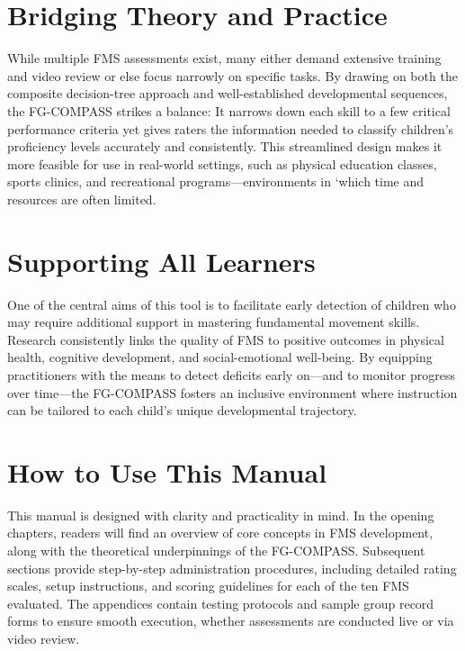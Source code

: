 \documentclass[
  letterpaper,
  DIV=11,
  numbers=noendperiod]{scrreprt}
\begin{document}
\section*{Bridging Theory and
Practice}\label{bridging-theory-and-practice}


While multiple FMS assessments exist, many either demand extensive
training and video review or else focus narrowly on specific tasks. By
drawing on both the composite decision-tree approach and
well-established developmental sequences, the FG-COMPASS strikes a
balance: It narrows down each skill to a few critical performance
criteria yet gives raters the information needed to classify children's
proficiency levels accurately and consistently. This streamlined design
makes it more feasible for use in real-world settings, such as physical
education classes, sports clinics, and recreational
programs---environments in `which time and resources are often limited.

\section*{Supporting All Learners}\label{supporting-all-learners}


One of the central aims of this tool is to facilitate early detection of
children who may require additional support in mastering fundamental
movement skills. Research consistently links the quality of FMS to
positive outcomes in physical health, cognitive development, and
social-emotional well-being. By equipping practitioners with the means
to detect deficits early on---and to monitor progress over time---the
FG-COMPASS fosters an inclusive environment where instruction can be
tailored to each child's unique developmental trajectory.

\section*{How to Use This Manual}\label{how-to-use-this-manual}


This manual is designed with clarity and practicality in mind. In the
opening chapters, readers will find an overview of core concepts in FMS
development, along with the theoretical underpinnings of the FG-COMPASS.
Subsequent sections provide step-by-step administration procedures,
including detailed rating scales, setup instructions, and scoring
guidelines for each of the ten FMS evaluated. The appendices contain
testing protocols and sample group record forms to ensure smooth
execution, whether assessments are conducted live or via video review.
\end{document}
